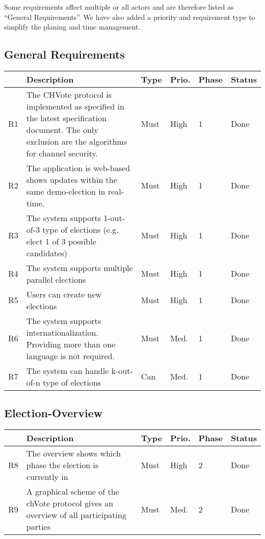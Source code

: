 Some requirements affect multiple or all actors and are therefore listed as "`General Requirements"'. We have also added a priority and requirement type to simplify the planing and time management.
\subsection{General Requirements}
\begin{longtable}{p{0.5cm}p{9cm}p{1cm}p{1cm}p{1cm}p{1cm}}
\hline
 & Description & Type & Prio. & Phase & Status\\
\hline
R1 & The CHVote protocol is implemented as specified in the latest specification document. The only exclusion are the algorithms for channel security. & Must & High & 1 & Done\\
R2 & The application is web-based shows updates within the same demo-election in real-time. & Must & High & 1 & Done\\
R3 & The system supports 1-out-of-3 type of elections (e.g. elect 1 of 3 possible candidates) & Must & High & 1 & Done\\
R4 & The system supports multiple parallel elections & Must & High & 1 &  Done\\
R5 & Users can create new elections & Must & High & 1 & Done \\
R6 & The system supports internationalization. Providing more than one language is not required. & Must & Med. & 1 & Done\\
R7 & The system can handle k-out-of-n type of elections & Can & Med. & 1 & Done\\
\end{longtable}


\subsection{Election-Overview}
\begin{longtable}{p{0.5cm}p{9cm}p{1cm}p{1cm}p{1cm}p{1cm}}
\hline
 & Description & Type & Prio. & Phase & Status\\
\hline
R8 & The overview shows which phase the election is currently in & Must & High & 2 & Done\\
R9 & A graphical scheme of the chVote protocol gives an overview of all participating parties & Must & Med. & 2 & Done\\
\end{longtable}


